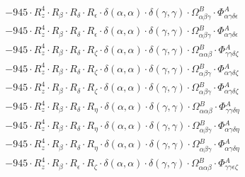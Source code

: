 \documentclass{article}
\begin{document}
\begin{subequations}
\begin{gather}
\begin{array}{c}
 \\[0.2em] 		 - 945 \cdot R_{z}^{4} \cdot R_{\beta{}} \cdot R_{\delta{}} \cdot R_{\epsilon{}} \cdot \delta{}\left(\alpha{}, \alpha{}\right) \cdot \delta{}\left(\gamma{}, \gamma{}\right) \cdot \Omega{}^{B}_{\alpha{}\beta{}\gamma{}} \cdot \Phi{}^{A}_{\alpha{}\gamma{}\delta{}\epsilon{}} 
 \\[0.2em] 		 - 945 \cdot R_{z}^{4} \cdot R_{\beta{}} \cdot R_{\delta{}} \cdot R_{\epsilon{}} \cdot \delta{}\left(\alpha{}, \alpha{}\right) \cdot \delta{}\left(\gamma{}, \gamma{}\right) \cdot \Omega{}^{B}_{\alpha{}\beta{}\gamma{}} \cdot \Phi{}^{A}_{\alpha{}\gamma{}\delta{}\epsilon{}} 
 \\[0.2em] 		 - 945 \cdot R_{z}^{4} \cdot R_{\beta{}} \cdot R_{\delta{}} \cdot R_{\zeta{}} \cdot \delta{}\left(\alpha{}, \alpha{}\right) \cdot \delta{}\left(\gamma{}, \gamma{}\right) \cdot \Omega{}^{B}_{\alpha{}\alpha{}\beta{}} \cdot \Phi{}^{A}_{\gamma{}\gamma{}\delta{}\zeta{}} 
 \\[0.2em] 		 - 945 \cdot R_{z}^{4} \cdot R_{\beta{}} \cdot R_{\delta{}} \cdot R_{\zeta{}} \cdot \delta{}\left(\alpha{}, \alpha{}\right) \cdot \delta{}\left(\gamma{}, \gamma{}\right) \cdot \Omega{}^{B}_{\alpha{}\beta{}\gamma{}} \cdot \Phi{}^{A}_{\alpha{}\gamma{}\delta{}\zeta{}} 
 \\[0.2em] 		 - 945 \cdot R_{z}^{4} \cdot R_{\beta{}} \cdot R_{\delta{}} \cdot R_{\zeta{}} \cdot \delta{}\left(\alpha{}, \alpha{}\right) \cdot \delta{}\left(\gamma{}, \gamma{}\right) \cdot \Omega{}^{B}_{\alpha{}\beta{}\gamma{}} \cdot \Phi{}^{A}_{\alpha{}\gamma{}\delta{}\zeta{}} 
 \\[0.2em] 		 - 945 \cdot R_{z}^{4} \cdot R_{\beta{}} \cdot R_{\delta{}} \cdot R_{\eta{}} \cdot \delta{}\left(\alpha{}, \alpha{}\right) \cdot \delta{}\left(\gamma{}, \gamma{}\right) \cdot \Omega{}^{B}_{\alpha{}\alpha{}\beta{}} \cdot \Phi{}^{A}_{\gamma{}\gamma{}\delta{}\eta{}} 
 \\[0.2em] 		 - 945 \cdot R_{z}^{4} \cdot R_{\beta{}} \cdot R_{\delta{}} \cdot R_{\eta{}} \cdot \delta{}\left(\alpha{}, \alpha{}\right) \cdot \delta{}\left(\gamma{}, \gamma{}\right) \cdot \Omega{}^{B}_{\alpha{}\beta{}\gamma{}} \cdot \Phi{}^{A}_{\alpha{}\gamma{}\delta{}\eta{}} 
 \\[0.2em] 		 - 945 \cdot R_{z}^{4} \cdot R_{\beta{}} \cdot R_{\delta{}} \cdot R_{\eta{}} \cdot \delta{}\left(\alpha{}, \alpha{}\right) \cdot \delta{}\left(\gamma{}, \gamma{}\right) \cdot \Omega{}^{B}_{\alpha{}\beta{}\gamma{}} \cdot \Phi{}^{A}_{\alpha{}\gamma{}\delta{}\eta{}} 
 \\[0.2em] 		 - 945 \cdot R_{z}^{4} \cdot R_{\beta{}} \cdot R_{\epsilon{}} \cdot R_{\zeta{}} \cdot \delta{}\left(\alpha{}, \alpha{}\right) \cdot \delta{}\left(\gamma{}, \gamma{}\right) \cdot \Omega{}^{B}_{\alpha{}\alpha{}\beta{}} \cdot \Phi{}^{A}_{\gamma{}\gamma{}\epsilon{}\zeta{}} 

\end{array}
\end{gather}
\end{subequations}
\end{document}
